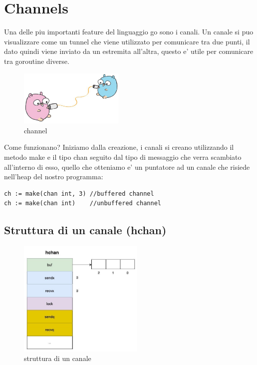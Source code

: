 \section{Channels}
Una delle piu importanti feature del linguaggio go sono i canali.\newline 
Un canale si puo visualizzare come un tunnel che viene utilizzato per comunicare tra due punti, il dato quindi viene inviato da un estremita all'altra, questo e' utile per comunicare tra goroutine diverse.

\begin{figure}[h!]
    \centering
    \includegraphics[width=5cm]{channel.jpg}
    \caption{channel}
    \label{fig:title}
\end{figure}

Come funzionano? Iniziamo dalla creazione, i canali si creano utilizzando il metodo make e il tipo chan seguito dal tipo di messaggio che verra scambiato all'interno di esso, quello che otteniamo e' un puntatore ad un canale che risiede nell'heap del nostro programma: \newline

\begin{lstlisting}
ch := make(chan int, 3) //buffered channel
ch := make(chan int)    //unbuffered channel
\end{lstlisting}

\subsection{Struttura di un canale (hchan)} 

\begin{figure}[h!]
    \centering
    \includegraphics[width=6cm]{sections/channel-struct.jpeg}
    \caption{struttura di un canale}
    \label{fig:title}
\end{figure}


